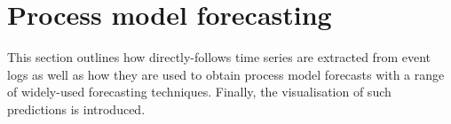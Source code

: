\section{Process model forecasting}\label{sec:methodology}
This section outlines how directly-follows time series are extracted from event logs as well as how they are used to obtain process model forecasts with a range of widely-used forecasting techniques.
Finally, the visualisation of such predictions is introduced.





